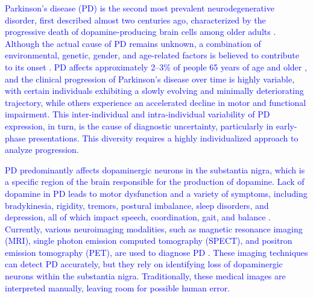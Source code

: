 \documentclass[twocolumn]{article}
\begin{document}
\textcolor{blue}{Parkinson's disease (PD) is the second most prevalent neurodegenerative disorder, first described almost two centuries ago, characterized by the progressive death of dopamine-producing brain cells among older adults . Although the actual cause of PD remains unknown, a combination of environmental, genetic, gender, and age-related factors is believed to contribute to its onset \cite{DBLP:journals/fgcs/AbdulhayNNVV18}. PD affects approximately 2–3\% of people 65 years of age and older \cite{lundervold2019overview}, and the clinical progression of Parkinson's disease over time is highly variable, with certain individuals exhibiting a slowly evolving and minimally deteriorating trajectory, while others experience an accelerated decline in motor and functional impairment. This inter-individual and intra-individual variability of PD expression, in turn, is the cause of diagnostic uncertainty, particularly in early-phase presentations. This diversity requires a highly individualized approach to analyze progression.}

\textcolor{blue}{PD predominantly affects dopaminergic neurons in the substantia nigra, which is a specific region of the brain responsible for the production of dopamine. Lack of dopamine in PD leads to motor dysfunction and a variety of symptoms, including bradykinesia, rigidity, tremors, postural imbalance, sleep disorders, and depression, all of which impact speech, coordination, gait, and balance \cite{majhi2024improved}. Currently, various neuroimaging modalities, such as magnetic resonance imaging (MRI), single photon emission computed tomography (SPECT), and positron emission tomography (PET), are used to diagnose PD \cite{hirschauer2015computer, suwijn2015diagnostic, adeli2017kernel, khachnaoui2020machine}. These imaging techniques can detect PD accurately, but they rely on identifying loss of dopaminergic neurons within the substantia nigra. Traditionally, these medical images are interpreted manually, leaving room for possible human error.}
\end{document}
